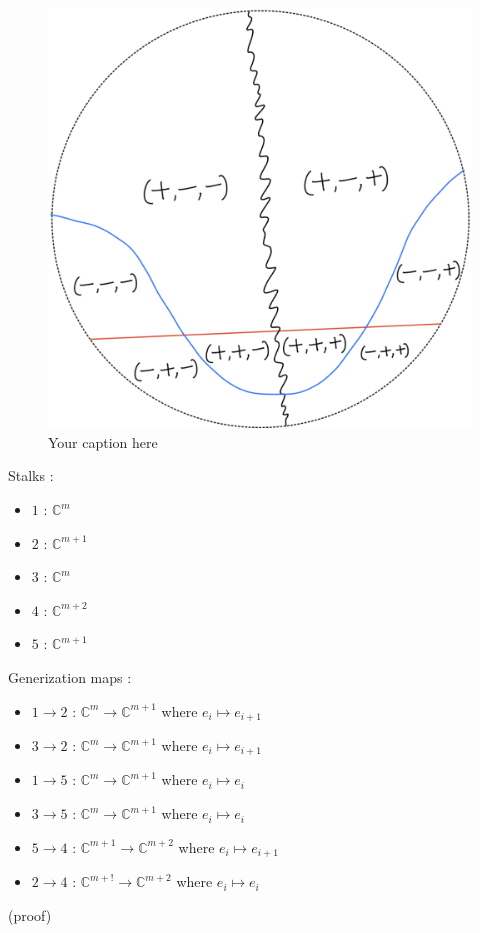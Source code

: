 \begin{figure}[H] %
    \centering
    \includegraphics[scale = 0.95]{diagrams/lemma1/4.png} %
    \caption{Your caption here}
    \label{fig:your-label}
\end{figure}

Stalks :
\begin{itemize}
\item $1$ : $\mathbb{C}^{m}$
\item $2$ : $\mathbb{C}^{m+1}$
\item $3$ : $\mathbb{C}^{m}$
\item $4$ : $\mathbb{C}^{m+2}$
\item $5$ : $\mathbb{C}^{m+1}$
\end{itemize}
Generization maps :
\begin{itemize}
\item $1\rightarrow 2$ : $\mathbb{C}^{m}\rightarrow \mathbb{C}^{m+1}$ where $e_i\mapsto e_{i+1}$
\item $3\rightarrow 2$ : $\mathbb{C}^{m}\rightarrow \mathbb{C}^{m+1}$ where $e_i\mapsto e_{i+1}$
\item $1\rightarrow 5$ : $\mathbb{C}^{m}\rightarrow \mathbb{C}^{m+1}$ where $e_i\mapsto e_{i}$
\item $3\rightarrow 5$ : $\mathbb{C}^{m}\rightarrow \mathbb{C}^{m+1}$ where $e_i\mapsto e_{i}$
\item $5\rightarrow 4$ : $\mathbb{C}^{m+1}\rightarrow \mathbb{C}^{m+2}$ where $e_i\mapsto e_{i+1}$
\item $2\rightarrow 4$ : $\mathbb{C}^{m+!}\rightarrow \mathbb{C}^{m+2}$ where $e_i\mapsto e_{i}$
\end{itemize}

(proof)